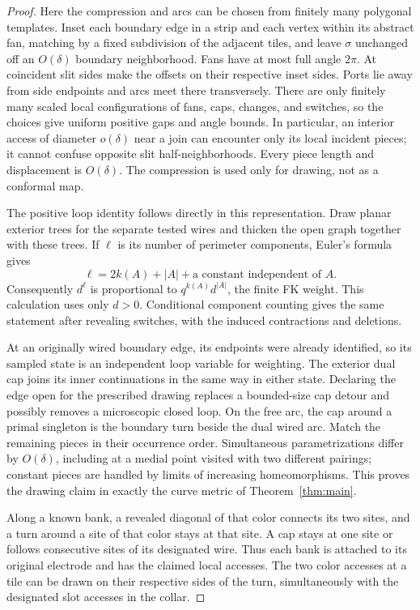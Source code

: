 \begin{proof}
Here the compression and arcs can be chosen from finitely many
polygonal templates.  Inset each boundary edge in a strip and each
vertex within its abstract fan, matching by a fixed subdivision of
the adjacent tiles, and leave $\sigma$ unchanged off an
$O(\delta)$ boundary neighborhood.  Fans have at most full angle
$2\pi$.  At coincident slit sides make the offsets on their
respective inset sides.  Ports lie away from side endpoints and
arcs meet there transversely.  There are only finitely many scaled
local configurations of fans, caps, changes, and switches, so the
choices give uniform positive gaps and angle bounds.  In particular,
an interior access of diameter $o(\delta)$ near a join can encounter
only its local incident pieces; it cannot confuse opposite slit
half-neighborhoods.  Every piece length and displacement is
$O(\delta)$.  The compression is used only for drawing, not as a
conformal map.

The positive loop identity follows directly in this representation.
Draw planar exterior trees for the separate tested wires and thicken
the open graph together with these trees.  If $\ell$ is its number
of perimeter components, Euler's formula gives
\[
 \ell=2k(A)+|A|+\text{a constant independent of }A.
\]
Consequently $d^\ell$ is proportional to
$q^{k(A)}d^{|A|}$, the finite FK weight.  This calculation uses only
$d>0$.  Conditional component counting gives the same statement
after revealing switches, with the induced contractions and deletions.

At an originally wired boundary edge, its endpoints were already
identified, so its sampled state is an independent loop variable
for weighting.  The exterior dual cap joins its inner continuations
in the same way in either state.  Declaring the edge open for the
prescribed drawing replaces a bounded-size cap detour and possibly
removes a microscopic closed loop.  On the free arc, the cap around
a primal singleton is the boundary turn beside the dual wired arc.
Match the remaining pieces in their occurrence order.  Simultaneous
parametrizations differ by $O(\delta)$, including at a medial point
visited with two different pairings; constant pieces are handled
by limits of increasing homeomorphisms.  This proves the drawing
claim in exactly the curve metric of Theorem~\ref{thm:main}.

Along a known bank, a revealed diagonal of that color connects its
two sites, and a turn around a site of that color stays at that site.
A cap stays at one site or follows consecutive sites of its designated
wire.  Thus each bank is attached to its original electrode and has
the claimed local accesses.  The two color accesses at a tile can
be drawn on their respective sides of the turn, simultaneously
with the designated slot accesses in the collar.


\end{proof}
